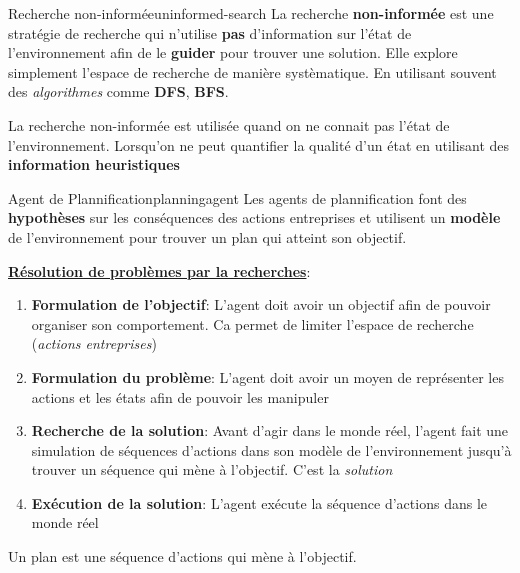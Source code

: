 
\begin{definition}{Recherche non-informée}{uninformed-search}
    La recherche \textbf{non-informée} est une stratégie de recherche qui n'utilise \textbf{pas}
    d'information sur l'état de l'environnement afin de le \textbf{guider} pour trouver une solution.
    Elle explore simplement l'espace de recherche de manière systèmatique. En utilisant souvent 
    des \textit{algorithmes} comme \textbf{DFS}, \textbf{BFS}.
\end{definition}

\begin{remark}\leavevmode
    La recherche non-informée est utilisée quand on ne connait pas l'état de l'environnement. 
    Lorsqu'on ne peut quantifier la qualité d'un état en utilisant des \textbf{information heuristiques}
\end{remark}

\begin{definition}{Agent de Plannification}{planningagent}
    Les agents de plannification font des \textbf{hypothèses} sur les conséquences des actions entreprises
    et utilisent un \textbf{modèle} de l'environnement pour trouver un plan qui atteint son objectif.
\end{definition}

\underline{\textbf{Résolution de problèmes par la recherches}}:
\begin{enumerate}
    \item \textbf{Formulation de l'objectif}: L'agent doit avoir un objectif afin 
        de pouvoir organiser son comportement. Ca permet de limiter l'espace de recherche (\textit{actions entreprises})
    \item \textbf{Formulation du problème}: L'agent doit avoir un moyen de représenter les actions et les états 
        afin de pouvoir les manipuler
    \item \textbf{Recherche de la solution}: Avant d'agir dans le monde réel, l'agent  fait  une 
        simulation de séquences d'actions dans son modèle de l'environnement jusqu'à trouver un séquence 
        qui mène à l'objectif. C'est  la \textit{solution}
    \item \textbf{Exécution de la solution}: L'agent exécute la séquence d'actions dans le monde réel
\end{enumerate}

\begin{note}
    Un plan est une séquence d'actions qui mène à l'objectif.
\end{note}

